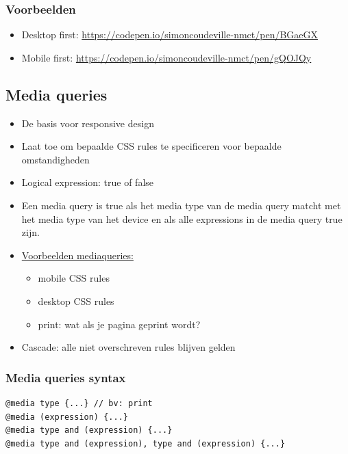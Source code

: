 \documentclass{article}
\begin{document}
\subsubsection{Voorbeelden}

\begin{itemize}
    \item Desktop first: \url{https://codepen.io/simoncoudeville-nmct/pen/BGaeGX}
    \item Mobile first: \url{https://codepen.io/simoncoudeville-nmct/pen/gQOJQy}
\end{itemize}

\subsection{Media queries}
\begin{itemize}
    \item De basis voor responsive design
    \item Laat toe om bepaalde CSS rules te specificeren voor bepaalde omstandigheden
    \item Logical expression: true of false
    \item Een media query is true als het media type van de media query matcht met het media type van het device en als alle expressions in de media query true zijn.
    \item \underline{Voorbeelden mediaqueries:}
    \begin{itemize}
        \item mobile CSS rules
        \item desktop CSS rules
        \item print: wat als je pagina geprint wordt?
    \end{itemize}
    \item Cascade: alle niet overschreven rules blijven gelden
\end{itemize}

\subsubsection{Media queries syntax}
\begin{lstlisting}
@media type {...} // bv: print
@media (expression) {...}   
@media type and (expression) {...}
@media type and (expression), type and (expression) {...}
\end{lstlisting}
\end{document}
